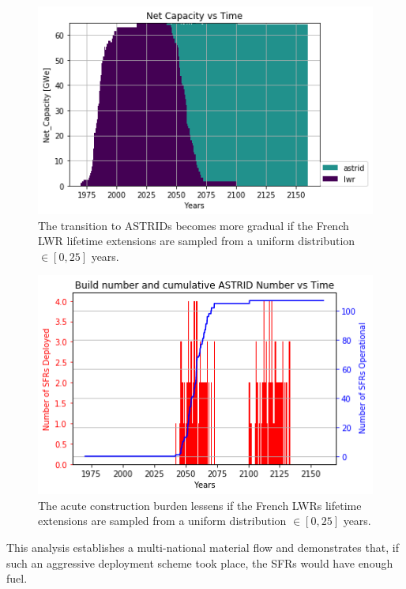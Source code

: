 \begin{figure}[htbp!]
	\begin{center}
		\includegraphics[scale=0.7]{./images/french-transition/unif_0_25.png}
	\end{center}
	\caption{The transition to \glspl{ASTRID}
		becomes more gradual if the
		French \gls{LWR} lifetime extensions are sampled from a 
		uniform distribution $\in [0, 25]$ years.}
	\label{fig:sfr_num_norm}
\end{figure}

\begin{figure}[htbp!]
	\begin{center}
		\includegraphics[scale=0.7]{./images/french-transition/unif_0_25_dep.png}
	\end{center}
	\caption{The acute construction burden lessens if the
		French \glspl{LWR} lifetime extensions are sampled from a 
		uniform distribution $\in [0, 25]$ years.}
	\label{fig:sfr_dep_norm}
\end{figure}

\FloatBarrier

This analysis establishes a multi-national material flow and demonstrates that, if such an aggressive deployment scheme took place, the \glspl{SFR} would have enough fuel.

